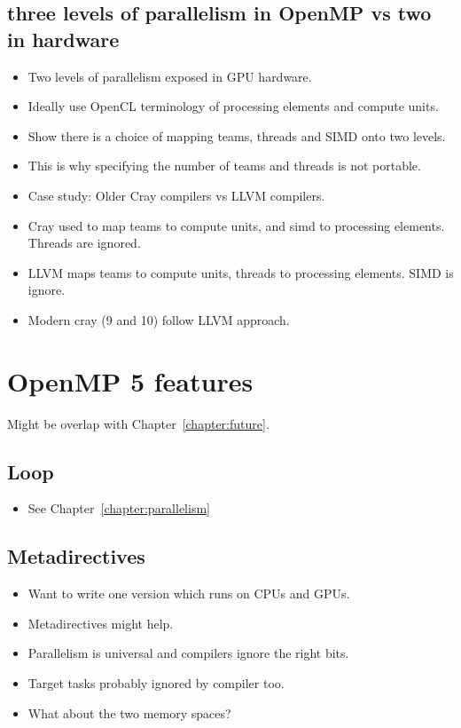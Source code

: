 \subsection{three levels of parallelism in OpenMP vs two in hardware}
\begin{itemize}
  \item Two levels of parallelism exposed in GPU hardware.
  \item Ideally use OpenCL terminology of processing elements and compute units.
  \item Show there is a choice of mapping teams, threads and SIMD onto two levels.
  \item This is why specifying the number of teams and threads is not portable.
  \item Case study: Older Cray compilers vs LLVM compilers.
  \item Cray used to map teams to compute units, and simd to processing elements. Threads are ignored.
  \item LLVM maps teams to compute units, threads to processing elements. SIMD is ignore.
  \item Modern cray (9 and 10) follow LLVM approach.
\end{itemize}

\section{OpenMP 5 features}
Might be overlap with Chapter~\ref{chapter:future}.

\subsection{Loop}
\begin{itemize}
  \item See Chapter~\ref{chapter:parallelism}
\end{itemize}

\subsection{Metadirectives}
\begin{itemize}
  \item Want to write one version which runs on CPUs and GPUs.
  \item Metadirectives might help.
  \item Parallelism is universal and compilers ignore the right bits.
  \item Target tasks probably ignored by compiler too.
  \item What about the two memory spaces?
\end{itemize}

